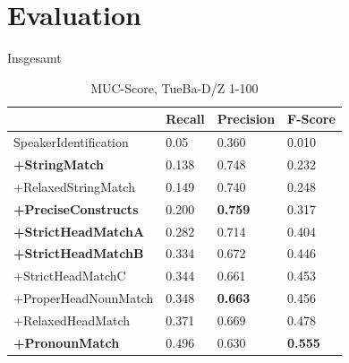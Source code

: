 \documentclass[11pt,a4paper]{beamer}
\begin{document}
\section{Evaluation}
\begin{frame}{Insgesamt}
\begin{table}[h]
\begin{tabular}{l||lll}
                            & \textbf{Recall} & \textbf{Precision} & \textbf{F-Score} \\ \hline
SpeakerIdentification       & 0.05            & 0.360              & 0.010            \\
\textbf{+StringMatch}       & 0.138           & 0.748              & 0.232            \\
+RelaxedStringMatch         & 0.149           & 0.740              & 0.248            \\
\textbf{+PreciseConstructs} & 0.200           & \textbf{0.759}     & 0.317            \\
\textbf{+StrictHeadMatchA}  & 0.282           & 0.714              & 0.404            \\
\textbf{+StrictHeadMatchB}  & 0.334           & 0.672              & 0.446            \\
+StrictHeadMatchC           & 0.344           & 0.661              & 0.453            \\
+ProperHeadNounMatch        & 0.348           & \textbf{0.663}     & 0.456            \\
+RelaxedHeadMatch           & 0.371           & 0.669              & 0.478            \\
\textbf{+PronounMatch}      & 0.496           & 0.630              & \textbf{0.555}       
\end{tabular}
\caption{MUC-Score, TueBa-D/Z 1-100}
\end{table}
\end{frame}
\end{document}
